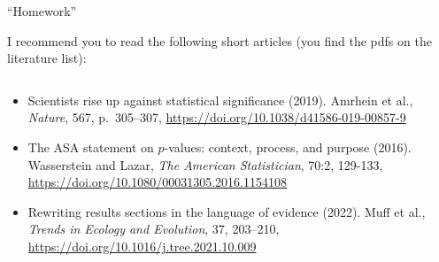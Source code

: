 \documentclass[
  10pt,
  ignorenonframetext,
]{beamer}
\providecommand{\tightlist}{%
  \setlength{\itemsep}{0pt}\setlength{\parskip}{0pt}}
\begin{document}
\begin{frame}{``Homework''}
\protect\hypertarget{homework}{}
\(~\)

I recommend you to read the following short articles (you find the pdfs
on the literature list):

\(~\)

\begin{itemize}
\tightlist
\item
  Scientists rise up against statistical significance (2019). Amrhein et
  al., \emph{Nature}, 567, p.~305--307,
  \url{https://doi.org/10.1038/d41586-019-00857-9}
\end{itemize}

\vspace{2mm}

\begin{itemize}
\tightlist
\item
  The ASA statement on \(p\)-values: context, process, and purpose
  (2016). Wasserstein and Lazar, \emph{The American Statistician}, 70:2,
  129-133, \url{https://doi.org/10.1080/00031305.2016.1154108}
\end{itemize}

\vspace{2mm}

\begin{itemize}
\tightlist
\item
  Rewriting results sections in the language of evidence (2022). Muff et
  al., \emph{Trends in Ecology and Evolution}, 37, 203--210,
  \url{https://doi.org/10.1016/j.tree.2021.10.009}
\end{itemize}
\end{frame}
\end{document}
